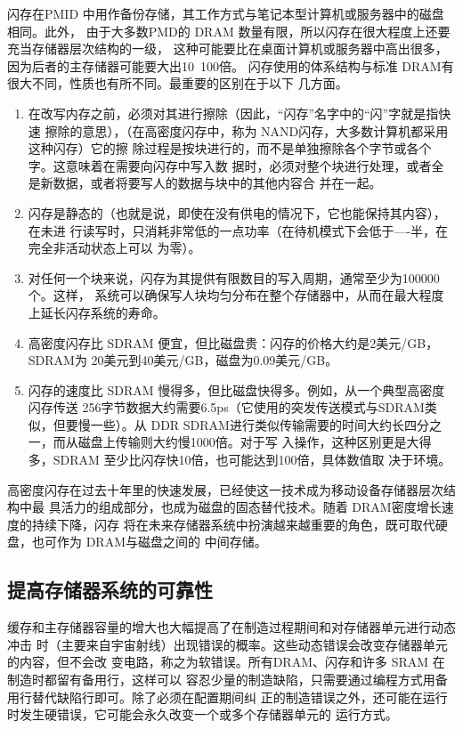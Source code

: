 闪存在PMID 中用作备份存储，其工作方式与笔记本型计算机或服务器中的磁盘相同。此外，
由于大多数PMD的 DRAM 数量有限，所以闪存在很大程度上还要充当存储器层次结构的一级，
这种可能要比在桌面计算机或服务器中高出很多，因为后者的主存储器可能要大出10~100倍。
闪存使用的体系结构与标准 DRAM有很大不同，性质也有所不同。最重要的区别在于以下
几方面。

\begin{enumerate}
    \item 在改写内存之前，必须对其进行擦除（因此，“闪存”名字中的“闪”字就是指快速
    擦除的意思），（在高密度闪存中，称为 NAND闪存，大多数计算机都采用这种闪存）它的擦
    除过程是按块进行的，而不是单独擦除各个字节或各个字。这意味着在需要向闪存中写入数
    据时，必须对整个块进行处理，或者全是新数据，或者将要写人的数据与块中的其他内容合
    并在一起。
    \item 闪存是静态的（也就是说，即使在没有供电的情况下，它也能保持其内容），在未进
    行读写时，只消耗非常低的一点功率（在待机模式下会低于—-半，在完全非活动状态上可以
    为零）。
    \item 对任何一个块来说，闪存为其提供有限数目的写入周期，通常至少为100000个。这样，
    系统可以确保写人块均匀分布在整个存储器中，从而在最大程度上延长闪存系统的寿命。
    \item 高密度闪存比 SDRAM 便宜，但比磁盘贵：闪存的价格大约是2美元/GB，SDRAM为
    20美元到40美元/GB，磁盘为0.09美元/GB。
    \item 闪存的速度比 SDRAM 慢得多，但比磁盘快得多。例如，从一个典型高密度闪存传送
    256字节数据大约需要6.5ps（它使用的突发传送模式与SDRAM类似，但要慢一些）。从 DDR
    SDRAM进行类似传输需要的时间大约长四分之一，而从磁盘上传输则大约慢1000倍。对于写
    入操作，这种区别更是大得多，SDRAM 至少比闪存快10倍，也可能达到100倍，具体数值取
    决于环境。
\end{enumerate}

高密度闪存在过去十年里的快速发展，已经使这一技术成为移动设备存储器层次结构中最
具活力的组成部分，也成为磁盘的固态替代技术。随着 DRAM密度增长速度的持续下降，闪存
将在未来存储器系统中扮演越来越重要的角色，既可取代硬盘，也可作为 DRAM与磁盘之间的
中间存储。

\subsection{提高存储器系统的可靠性}
缓存和主存储器容量的增大也大幅提高了在制造过程期间和对存储器单元进行动态冲击
时（主要来自宇宙射线）出现错误的概率。这些动态错误会改变存储器单元的内容，但不会改
变电路，称之为软错误。所有DRAM、闪存和许多 SRAM 在制造时都留有备用行，这样可以
容忍少量的制造缺陷，只需要通过编程方式用备用行替代缺陷行即可。除了必须在配置期间纠
正的制造错误之外，还可能在运行时发生硬错误，它可能会永久改变一个或多个存储器单元的
运行方式。

